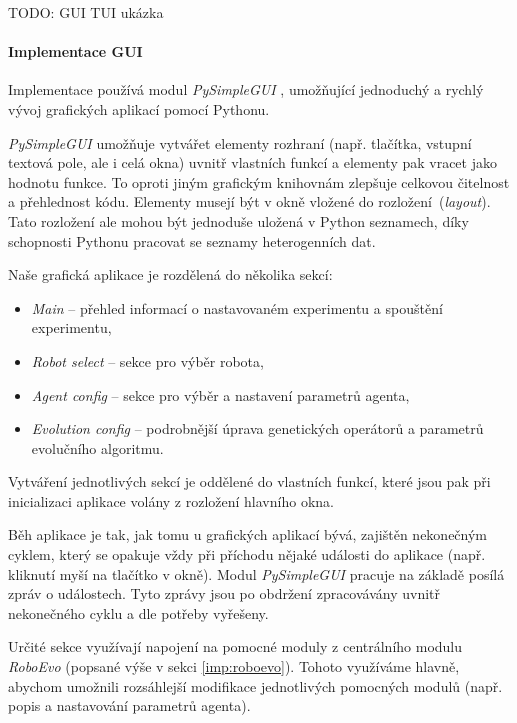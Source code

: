 TODO: GUI TUI ukázka

\paragraph{Implementace GUI}
Implementace používá modul \emph{PySimpleGUI} \citep{pysimplegui}, umožňující
jednoduchý a rychlý vývoj grafických aplikací pomocí Pythonu. 

\emph{PySimpleGUI} umožňuje vytvářet elementy rozhraní (např.
tlačítka, vstupní textová pole, ale i celá okna) uvnitř vlastních funkcí a
elementy pak vracet jako hodnotu funkce. To oproti jiným grafickým knihovnám
zlepšuje celkovou čitelnost a přehlednost kódu. Elementy musejí být v okně
vložené do rozložení~(\emph{layout}). Tato rozložení ale mohou být jednoduše
uložená v Python seznamech, díky schopnosti Pythonu pracovat se seznamy
heterogenních dat.

Naše grafická aplikace je rozdělená do několika sekcí:

\begin{itemize}
    \item \emph{Main} -- přehled informací o nastavovaném experimentu a
        spouštění experimentu,
    \item \emph{Robot select} -- sekce pro výběr robota,
    \item \emph{Agent config} -- sekce pro výběr a nastavení parametrů agenta,
    \item \emph{Evolution config} -- podrobnější úprava genetických operátorů a
        parametrů evolučního algoritmu.
\end{itemize}

Vytváření jednotlivých sekcí je oddělené do vlastních funkcí, které jsou pak
při inicializaci aplikace volány z rozložení hlavního okna.

Běh aplikace je tak, jak tomu u grafických aplikací bývá, zajištěn nekonečným
cyklem, který se opakuje vždy při příchodu nějaké události do aplikace (např.
kliknutí myší na tlačítko v okně). Modul \emph{PySimpleGUI} pracuje na základě
posílá zpráv o událostech. Tyto zprávy jsou po obdržení zpracovávány uvnitř
nekonečného cyklu a dle potřeby vyřešeny.

Určité sekce využívají napojení na pomocné moduly z centrálního modulu
\emph{RoboEvo} (popsané výše v sekci \ref{imp:roboevo}). Tohoto využíváme
hlavně, abychom umožnili rozsáhlejší modifikace jednotlivých pomocných modulů
(např. popis a nastavování parametrů agenta).

